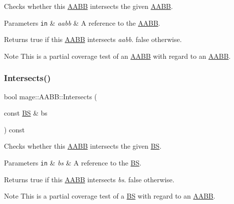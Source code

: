 Checks whether this \hyperlink{structmage_1_1_a_a_b_b}{A\+A\+BB} intersects the given \hyperlink{structmage_1_1_a_a_b_b}{A\+A\+BB}.


\begin{DoxyParams}[1]{Parameters}
\mbox{\tt in}  & {\em aabb} & A reference to the \hyperlink{structmage_1_1_a_a_b_b}{A\+A\+BB}. \\
\hline
\end{DoxyParams}
\begin{DoxyReturn}{Returns}
{\ttfamily true} if this \hyperlink{structmage_1_1_a_a_b_b}{A\+A\+BB} intersects {\itshape aabb}. {\ttfamily false} otherwise. 
\end{DoxyReturn}
\begin{DoxyNote}{Note}
This is a partial coverage test of an \hyperlink{structmage_1_1_a_a_b_b}{A\+A\+BB} with regard to an \hyperlink{structmage_1_1_a_a_b_b}{A\+A\+BB}. 
\end{DoxyNote}
\hypertarget{structmage_1_1_a_a_b_b_ac51fa4b4d3100d587c6a2d2b5513ad88}{}\label{structmage_1_1_a_a_b_b_ac51fa4b4d3100d587c6a2d2b5513ad88} 
\subsubsection{\texorpdfstring{Intersects()}{Intersects()}\hspace{0.1cm}{\footnotesize\ttfamily [4/4]}}
{\footnotesize\ttfamily bool mage\+::\+A\+A\+B\+B\+::\+Intersects (\begin{DoxyParamCaption}\item[{const \hyperlink{structmage_1_1_b_s}{BS} \&}]{bs }\end{DoxyParamCaption}) const\hspace{0.3cm}{\ttfamily [noexcept]}}

Checks whether this \hyperlink{structmage_1_1_a_a_b_b}{A\+A\+BB} intersects the given \hyperlink{structmage_1_1_b_s}{BS}.


\begin{DoxyParams}[1]{Parameters}
\mbox{\tt in}  & {\em bs} & A reference to the \hyperlink{structmage_1_1_b_s}{BS}. \\
\hline
\end{DoxyParams}
\begin{DoxyReturn}{Returns}
{\ttfamily true} if this \hyperlink{structmage_1_1_a_a_b_b}{A\+A\+BB} intersects {\itshape bs}. {\ttfamily false} otherwise. 
\end{DoxyReturn}
\begin{DoxyNote}{Note}
This is a partial coverage test of a \hyperlink{structmage_1_1_b_s}{BS} with regard to an \hyperlink{structmage_1_1_a_a_b_b}{A\+A\+BB}. 
\end{DoxyNote}
\hypertarget{structmage_1_1_a_a_b_b_a25146a7fe2cc32b9cfab0e4556d76cc9}{}\label{structmage_1_1_a_a_b_b_a25146a7fe2cc32b9cfab0e4556d76cc9} 
